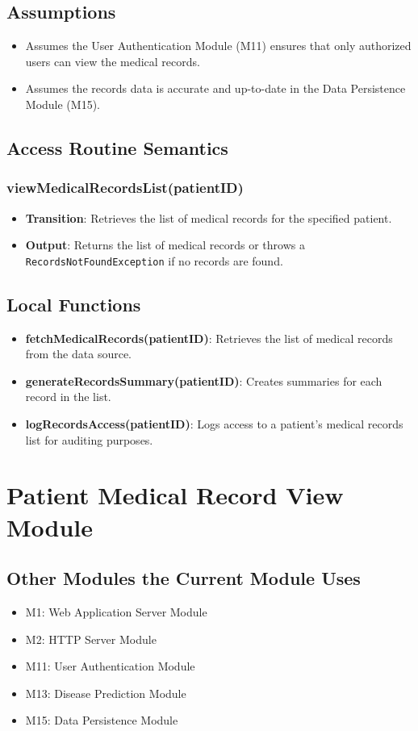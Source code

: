 \documentclass[12pt, titlepage]{article}
\begin{document}
\subsection{Assumptions}
\begin{itemize}
\item Assumes the User Authentication Module (M11) ensures that only authorized users can view the medical records.
\item Assumes the records data is accurate and up-to-date in the Data Persistence Module (M15).
\end{itemize}

\subsection{Access Routine Semantics}
\subsubsection{viewMedicalRecordsList(patientID)}
\begin{itemize}
    \item \textbf{Transition}: Retrieves the list of medical records for the specified patient.
    \item \textbf{Output}: Returns the list of medical records or throws a \texttt{RecordsNotFoundException} if no records are found.
\end{itemize}

\subsection{Local Functions}
\begin{itemize}
\item \textbf{fetchMedicalRecords(patientID)}: Retrieves the list of medical records from the data source.
\item \textbf{generateRecordsSummary(patientID)}: Creates summaries for each record in the list.
\item \textbf{logRecordsAccess(patientID)}: Logs access to a patient's medical records list for auditing purposes.
\end{itemize}
\section{Patient Medical Record View Module}

\subsection{Other Modules the Current Module Uses}
\begin{itemize}
\item M1: Web Application Server Module
\item M2: HTTP Server Module
\item M11: User Authentication Module
\item M13: Disease Prediction Module 
\item M15: Data Persistence Module
\end{itemize}
\end{document}
